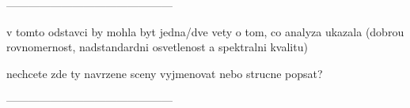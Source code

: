 ---------------------------------------------

v tomto odstavci by mohla byt jedna/dve vety o tom, co analyza ukazala
(dobrou rovnomernost, nadstandardni osvetlenost a spektralni kvalitu)

nechcete zde ty navrzene sceny vyjmenovat nebo strucne popsat?

---------------------------------------------



















